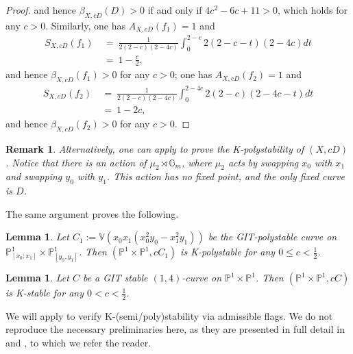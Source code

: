 \documentclass[a4paper,12pt]{amsart}
\newcommand{\bG}{\mathbb{G}}
\newcommand{\bV}{{\mathbb V}}
\newcommand{\bP}{{\mathbb P}}
\newtheorem{lemma}[theorem]{Lemma}
\newtheorem{remark}[theorem]{Remark}
\theoremstyle{definition}
\theoremstyle{remark}
\begin{document}
\begin{proof}
and hence $\beta_{X,cD}(D)>0$ if and only if $4c^2-6c+11>0$, which holds for any $c>0$. Similarly, one has $A_{X,cD}(f_1)=1$ and 
\begin{equation}\nonumber
    \begin{split}
        S_{X,cD}(f_1)& \ =\ \frac{1}{2(2-c)(2-4c)}\int_0^{2-c}2(2-c-t)(2-4c)dt\\
        & \ = \ 1-\frac{c}{2},
    \end{split}
\end{equation}
and hence $\beta_{X,cD}(f_1)>0$ for any $c>0$; one has $A_{X,cD}(f_2)=1$ and 
\begin{equation}\nonumber
    \begin{split}
        S_{X,cD}(f_2)& \ =\ \frac{1}{2(2-c)(2-4c)}\int_0^{2-4c}2(2-c)(2-4c-t)dt\\
        & \ = \ 1-2c,
    \end{split}
\end{equation}
and hence $\beta_{X,cD}(f_2)>0$ for any $c>0$.
\end{proof}

\begin{remark}
    \textup{Alternatively, one can apply \cite{Zhu21} to prove the K-polystability of $(X,cD)$. Notice that there is an action of $\mu_2 \rtimes \bG_m$, where $\mu_2$ acts by swapping $x_0$ with $x_1$ and swapping $y_0$ with $y_1$. This action has no fixed point, and the only fixed curve is $D$.} 
\end{remark}


The same argument proves the following.

\begin{lemma}\label{lem:polystable 2}
     Let $C_1:=\bV(x_0x_1(x_0^2y_0-x_1^2y_1))$ be the GIT-polystable curve on $\bP^1_{[x_0:x_1]}\times\bP^1_{[y_0,y_1]}$. Then $(\bP^1\times\bP^1,cC_1)$ is K-polystable for any $0\leq c<\frac{1}{2}$.
\end{lemma}


\begin{lemma}\label{lem:polystable 3}
    Let $C$ be a GIT stable $(1,4)$-curve on $\bP^1\times\bP^1$. Then $(\bP^1\times\bP^1,cC)$ is K-stable for any $0< c<\frac{1}{2}$.
\end{lemma}

We will apply \cite[Theorem~3.4]{AZ22} to verify K-(semi/poly)stability via admissible flags. We do not reproduce the necessary preliminaries here, as they are presented in full detail in \cite[Section~1.7]{ACC23} and \cite{Xu25}, to which we refer the reader.
 
\end{document}

